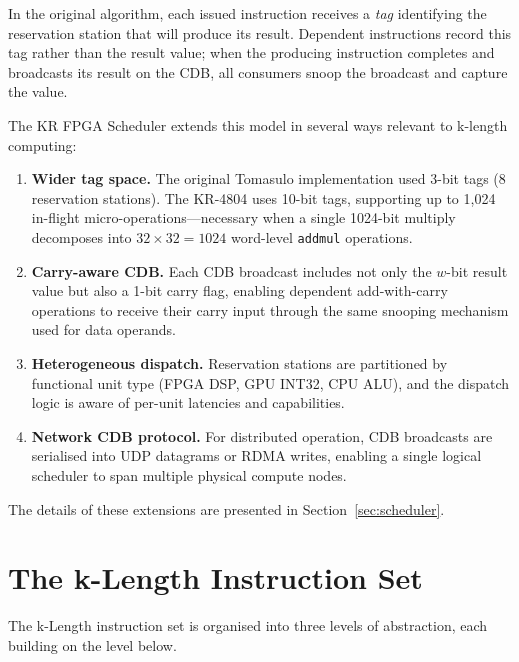 \documentclass[11pt,a4paper]{article}
\begin{document}
In the original algorithm, each issued instruction receives a \emph{tag}
identifying the reservation station that will produce its result.  Dependent
instructions record this tag rather than the result value; when the producing
instruction completes and broadcasts its result on the CDB, all consumers
snoop the broadcast and capture the value.

The KR FPGA Scheduler extends this model in several ways relevant to
k-length computing:

\begin{enumerate}[leftmargin=*]
  \item \textbf{Wider tag space.}  The original Tomasulo implementation used
    3-bit tags (8 reservation stations).  The KR-4804 uses 10-bit tags,
    supporting up to 1,024 in-flight micro-operations---necessary when a
    single 1024-bit multiply decomposes into $32 \times 32 = 1024$ word-level
    \texttt{addmul} operations.

  \item \textbf{Carry-aware CDB.}  Each CDB broadcast includes not only the
    $w$-bit result value but also a 1-bit carry flag, enabling dependent
    add-with-carry operations to receive their carry input through the
    same snooping mechanism used for data operands.

  \item \textbf{Heterogeneous dispatch.}  Reservation stations are partitioned
    by functional unit type (FPGA DSP, GPU INT32, CPU ALU), and the dispatch
    logic is aware of per-unit latencies and capabilities.

  \item \textbf{Network CDB protocol.}  For distributed operation, CDB
    broadcasts are serialised into UDP datagrams or RDMA writes, enabling
    a single logical scheduler to span multiple physical compute nodes.
\end{enumerate}

The details of these extensions are presented in Section~\ref{sec:scheduler}.


\section{The k-Length Instruction Set}
\label{sec:isa}

The k-Length instruction set is organised into three levels of abstraction,
each building on the level below.
\end{document}
